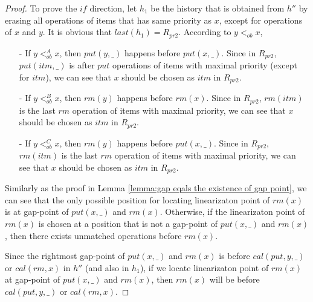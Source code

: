 \documentclass{llncs}
\begin{document}
\begin {proof}

To prove the $\textit{if}$ direction, let $h_1$ be the history that is obtained from $h''$ by erasing all operations of items that has same priority as $x$, except for operations of $x$ and $y$. It is obvious that $\textit{last}(h_1) = R_{\textit{pr2}}$.
According to $y <_{\textit{ob}} x$,

\begin{itemize}
\setlength{\itemsep}{0.5pt}
\item[-] If $y <_{\textit{ob}}^A x$, then $\textit{put}(y,\_)$ happens before $\textit{put}(x,\_)$. Since in $R_{\textit{pr2}}$, $\textit{put}(\textit{itm},\_)$ is after $\textit{put}$ operations of items with maximal priority (except for $\textit{itm}$), we can see that $x$ should be chosen as $\textit{itm}$ in $R_{\textit{pr2}}$.
\item[-] If $y <_{\textit{ob}}^B x$, then $\textit{rm}(y)$ happens before $\textit{rm}(x)$. Since in $R_{\textit{pr2}}$, $\textit{rm}(\textit{itm})$ is the last $\textit{rm}$ operation of items with maximal priority, we can see that $x$ should be chosen as $\textit{itm}$ in $R_{\textit{pr2}}$.

\item[-] If $y <_{\textit{ob}}^C x$, then $\textit{rm}(y)$ happens before $\textit{put}(x,\_)$. Since in $R_{\textit{pr2}}$, $\textit{rm}(\textit{itm})$ is the last $\textit{rm}$ operation of items with maximal priority, we can see that $x$ should be chosen as $\textit{itm}$ in $R_{\textit{pr2}}$.
\end{itemize}



Similarly as the proof in Lemma \ref{lemma:gap eqals the existence of gap point}, we can see that the only possible position for locating linearizaton point of $\textit{rm}(x)$ is at gap-point of $\textit{put}(x,\_)$ and $\textit{rm}(x)$. Otherwise, if the linearizaton point of $\textit{rm}(x)$ is chosen at a position that is not a gap-point of $\textit{put}(x,\_)$ and $\textit{rm}(x)$, then there exists unmatched operations before $\textit{rm}(x)$.

Since the rightmost gap-point of $\textit{put}(x,\_)$ and $\textit{rm}(x)$ is before $\textit{cal}(\textit{put},y,\_)$ or $\textit{cal}(\textit{rm},x)$ in $h''$ (and also in $h_1$), if we locate linearizaton point of $\textit{rm}(x)$ at gap-point of $\textit{put}(x,\_)$ and $\textit{rm}(x)$, then $\textit{rm}(x)$ will be before $\textit{cal}(\textit{put},y,\_)$ or $\textit{cal}(\textit{rm},x)$.


\end{proof}
\end{document}
